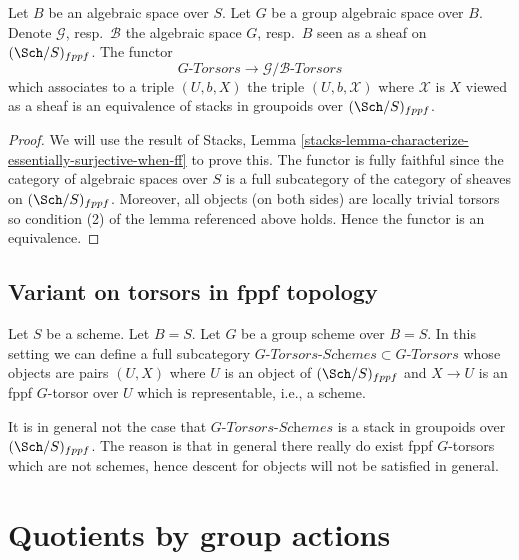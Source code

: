 \begin{lemma}
\label{lemma-compare-torsors}
Let $B$ be an algebraic space over $S$. Let $G$ be a group algebraic
space over $B$. Denote $\mathcal{G}$, resp.\ $\mathcal{B}$ the algebraic
space $G$, resp.\ $B$ seen as a sheaf on $(\Sch/S)_{fppf}$.
The functor
$$
G\textit{-Torsors} \longrightarrow \mathcal{G}/\mathcal{B}\textit{-Torsors}
$$
which associates to a triple $(U, b, X)$ the triple
$(U, b, \mathcal{X})$ where $\mathcal{X}$ is $X$ viewed as a sheaf
is an equivalence of stacks in groupoids over $(\Sch/S)_{fppf}$.
\end{lemma}

\begin{proof}
We will use the result of
Stacks, Lemma \ref{stacks-lemma-characterize-essentially-surjective-when-ff}
to prove this. The functor is fully faithful since the category of
algebraic spaces over $S$ is a full subcategory of the category of
sheaves on $(\Sch/S)_{fppf}$.
Moreover, all objects (on both sides) are locally trivial torsors
so condition (2) of the lemma referenced above holds.
Hence the functor is an equivalence.
\end{proof}



\subsection{Variant on torsors in fppf topology}
\label{subsection-variant-fppf-torsors}

\noindent
Let $S$ be a scheme. Let $B = S$.
Let $G$ be a group scheme over $B = S$.
In this setting we can define a full subcategory
$G\textit{-Torsors-Schemes} \subset G\textit{-Torsors}$
whose objects are pairs $(U, X)$ where $U$ is an object of
$(\Sch/S)_{fppf}$ and $X \to U$ is an fppf
$G$-torsor over $U$ which is representable, i.e., a scheme.

\medskip\noindent
It is in general not the case that $G\textit{-Torsors-Schemes}$ is
a stack in groupoids over $(\Sch/S)_{fppf}$. The reason is
that in general there really do exist fppf $G$-torsors
which are not schemes, hence descent for objects will not be satisfied
in general.






\section{Quotients by group actions}
\label{section-group-quotient-stacks}

